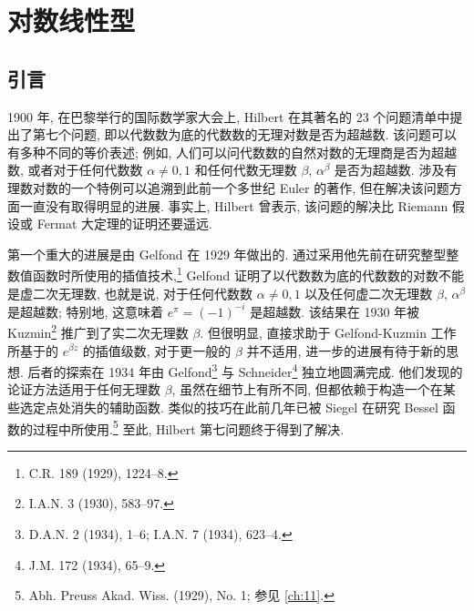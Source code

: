 
\chapter{对数线性型}\label{ch:2}

\section{引言}

1900 年, 在巴黎举行的国际数学家大会上, Hilbert 在其著名的 23 个问题清单中提出了第七个问题, 即以代数数为底的代数数的无理对数是否为超越数. 该问题可以有多种不同的等价表述; 例如, 人们可以问代数数的自然对数的无理商是否为超越数, 或者对于任何代数数 $\alpha \neq 0, 1$ 和任何代数无理数 $\beta$, $\alpha^{\beta}$ 是否为超越数. 涉及有理数对数的一个特例可以追溯到此前一个多世纪 Euler 的著作, 但在解决该问题方面一直没有取得明显的进展. 事实上, Hilbert 曾表示, 该问题的解决比 Riemann 假设或 Fermat 大定理的证明还要遥远.

第一个重大的进展是由 Gelfond 在 1929 年做出的. 通过采用他先前在研究整型整数值函数时所使用的插值技术,\footnote{C.R. 189 (1929), 1224--8.} Gelfond 证明了以代数数为底的代数数的对数不能是虚二次无理数, 也就是说, 对于任何代数数 $\alpha \neq 0, 1$ 以及任何虚二次无理数 $\beta$, $\alpha^{\beta}$ 是超越数; 特别地, 这意味着 $e^{\pi} = (-1)^{-i}$ 是超越数. 该结果在 1930 年被 Kuzmin\footnote{I.A.N. 3 (1930), 583--97.} 推广到了实二次无理数 $\beta$. 但很明显, 直接求助于 Gelfond-Kuzmin 工作所基于的 $e^{\beta z}$ 的插值级数, 对于更一般的 $\beta$ 并不适用, 进一步的进展有待于新的思想. 后者的探索在 1934 年由 Gelfond\footnote{D.A.N. 2 (1934), 1--6; I.A.N. 7 (1934), 623--4.} 与 Schneider\footnote{J.M. 172 (1934), 65--9.} 独立地圆满完成. 他们发现的论证方法适用于任何无理数 $\beta$, 虽然在细节上有所不同, 但都依赖于构造一个在某些选定点处消失的辅助函数. 类似的技巧在此前几年已被 Siegel 在研究 Bessel 函数的过程中所使用.\footnote{Abh. Preuss Akad. Wiss. (1929), No. 1; 参见 \autoref{ch:11}.} 至此, Hilbert 第七问题终于得到了解决.

